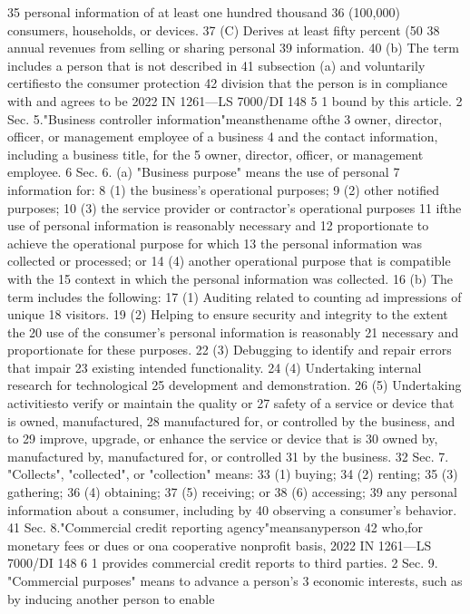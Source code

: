 35 personal information of at least one hundred thousand
36 (100,000) consumers, households, or devices.
37 (C) Derives at least fifty percent (50%
38 annual revenues from selling or sharing personal
39 information.
40 (b) The term includes a person that is not described in
41 subsection (a) and voluntarily certifiesto the consumer protection
42 division that the person is in compliance with and agrees to be
2022 IN 1261—LS 7000/DI 148
5
1 bound by this article.
2 Sec. 5."Business controller information"meansthename ofthe
3 owner, director, officer, or management employee of a business
4 and the contact information, including a business title, for the
5 owner, director, officer, or management employee.
6 Sec. 6. (a) "Business purpose" means the use of personal
7 information for:
8 (1) the business's operational purposes;
9 (2) other notified purposes;
10 (3) the service provider or contractor's operational purposes
11 ifthe use of personal information is reasonably necessary and
12 proportionate to achieve the operational purpose for which
13 the personal information was collected or processed; or
14 (4) another operational purpose that is compatible with the
15 context in which the personal information was collected.
16 (b) The term includes the following:
17 (1) Auditing related to counting ad impressions of unique
18 visitors.
19 (2) Helping to ensure security and integrity to the extent the
20 use of the consumer's personal information is reasonably
21 necessary and proportionate for these purposes.
22 (3) Debugging to identify and repair errors that impair
23 existing intended functionality.
24 (4) Undertaking internal research for technological
25 development and demonstration.
26 (5) Undertaking activitiesto verify or maintain the quality or
27 safety of a service or device that is owned, manufactured,
28 manufactured for, or controlled by the business, and to
29 improve, upgrade, or enhance the service or device that is
30 owned by, manufactured by, manufactured for, or controlled
31 by the business.
32 Sec. 7. "Collects", "collected", or "collection" means:
33 (1) buying;
34 (2) renting;
35 (3) gathering;
36 (4) obtaining;
37 (5) receiving; or
38 (6) accessing;
39 any personal information about a consumer, including by
40 observing a consumer's behavior.
41 Sec. 8."Commercial credit reporting agency"meansanyperson
42 who,for monetary fees or dues or ona cooperative nonprofit basis,
2022 IN 1261—LS 7000/DI 148
6
1 provides commercial credit reports to third parties.
2 Sec. 9. "Commercial purposes" means to advance a person's
3 economic interests, such as by inducing another person to enable
